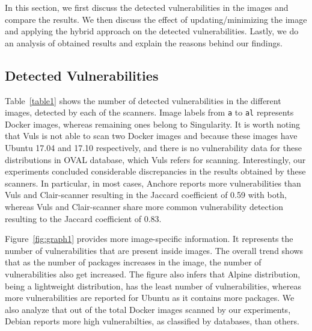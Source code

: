 \documentclass[a4paper,num-refs]{oup-contemporary}
\begin{document}
In this section,
we first discuss the detected vulnerabilities in the images and compare the
results. We then discuss the effect of updating/minimizing the image and applying the hybrid
approach on the detected vulnerabilities.
Lastly, we do an analysis of obtained results and explain the reasons behind our
findings.

\subsection{Detected Vulnerabilities}

Table~\ref{table1} shows the number of detected vulnerabilities in the different images,
detected by each of the scanners. Image labels from \texttt{a} to \texttt{al} represents
Docker images, whereas remaining ones belong to Singularity. It is worth noting that Vuls
is not able to scan two Docker images  and  because these images
have Ubuntu 17.04 and 17.10 respectively, and there is no vulnerability data for these
distributions in OVAL database, which Vuls refers for scanning. 
Interestingly, our experiments concluded considerable discrepancies in the results obtained by
these scanners. In particular, in most cases,
Anchore reports more vulnerabilities than Vuls and Clair-scanner resulting in 
the Jaccard coefficient of 0.59 with both,
whereas Vuls and Clair-scanner share more common vulnerability detection resulting to the Jaccard coefficient of 0.83.

Figure~\ref{fig:graph1} provides more image-specific information.
It represents the number of vulnerabilities that are present inside images.
The overall trend shows that as the number of packages increases in the image, the number of vulnerabilities
also get increased.
The figure also infers that Alpine distribution, being a
lightweight distribution, has the least number of vulnerabilities, whereas more vulnerabilities are reported for
Ubuntu as it contains more packages.
We also analyze that out of the total Docker images scanned by our experiments, Debian reports more high vulnerabilties, as
classified by databases, than others.
\end{document}
